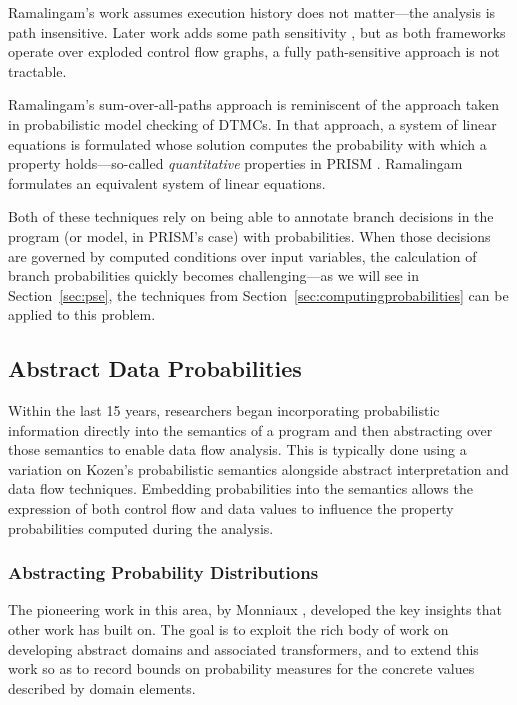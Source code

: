 Ramalingam's work assumes execution history does not 
matter---the analysis is path insensitive.
Later work adds some path sensitivity \cite{mehofer2001novel}, 
but as both frameworks operate over exploded control flow graphs, a fully 
path-sensitive approach is not tractable.

Ramalingam's sum-over-all-paths approach is reminiscent of
the approach taken in probabilistic model checking of DTMCs.
In that approach, a system of linear equations is formulated
whose solution computes the probability with which a property
holds---so-called \textit{quantitative} properties in 
PRISM \cite{kwiatkowska2010advances}.   Ramalingam formulates an
equivalent system of linear equations.  

Both of these techniques rely on being able to annotate
branch decisions in the program (or model, in PRISM's case)
with probabilities.  When those decisions are governed by
computed conditions over input variables, the calculation of
branch probabilities quickly becomes challenging---as we will
see in Section~\ref{sec:pse}, the techniques from 
Section~\ref{sec:computingprobabilities} can be applied to
this problem.


\subsection{Abstract Data Probabilities}
Within the last 15 years, researchers 
began incorporating probabilistic information directly into
the semantics of a program and then abstracting over 
those semantics 
\cite{monniaux2000abstract,smith2008probabilistic,cousot2012probabilistic}
to enable data flow analysis.
This is typically done using a variation on Kozen's 
probabilistic semantics \cite{kozen1981semantics} 
alongside abstract interpretation and data flow techniques.
Embedding probabilities into the semantics allows 
the expression of both control flow and data values to influence
the property probabilities computed during the analysis.

\subsubsection{Abstracting Probability Distributions}
The pioneering work in this area, by 
Monniaux \cite{monniaux2000abstract,monniaux2001backwards},
developed the key insights that other work has built on. 
The goal is to exploit the rich body of work on developing
abstract domains and associated transformers, and to extend this work 
so as to record bounds on probability measures for the concrete values
described by domain elements.

